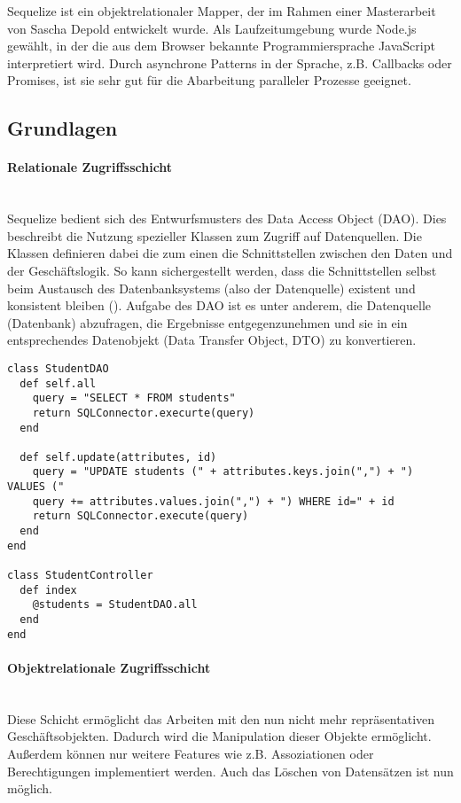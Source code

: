 
Sequelize ist ein objektrelationaler Mapper, der im Rahmen einer Masterarbeit von Sascha Depold entwickelt wurde. Als Laufzeitumgebung wurde Node.js gewählt, in der die aus dem Browser bekannte Programmiersprache JavaScript interpretiert wird. Durch asynchrone Patterns in der Sprache, z.B. Callbacks oder Promises, ist sie sehr gut für die Abarbeitung paralleler Prozesse geeignet.

\subsection{Grundlagen}

\paragraph{Relationale Zugriffsschicht} \hspace{0pt} \\
Sequelize bedient sich des Entwurfsmusters des Data Access Object (DAO). Dies beschreibt die Nutzung spezieller Klassen zum Zugriff auf Datenquellen. Die Klassen definieren dabei die zum einen die Schnittstellen zwischen den Daten und der Geschäftslogik. So kann sichergestellt werden, dass die Schnittstellen selbst beim Austausch des Datenbanksystems (also der Datenquelle) existent und konsistent bleiben (\cite[S. 8]{Depo1}). Aufgabe des DAO ist es unter anderem, die Datenquelle (Datenbank) abzufragen, die Ergebnisse entgegenzunehmen und sie in ein entsprechendes Datenobjekt (Data Transfer Object, DTO) zu konvertieren.

\hspace{1pt}
\begin{lstlisting}[caption=Relationale Zugriffsschicht]
class StudentDAO
  def self.all
    query = "SELECT * FROM students"
    return SQLConnector.execurte(query)
  end
  
  def self.update(attributes, id)
    query = "UPDATE students (" + attributes.keys.join(",") + ") VALUES ("
    query += attributes.values.join(",") + ") WHERE id=" + id
    return SQLConnector.execute(query)
  end
end

class StudentController
  def index
    @students = StudentDAO.all
  end
end
\end{lstlisting}


\paragraph{Objektrelationale Zugriffsschicht} \hspace{0pt} \\
Diese Schicht ermöglicht das Arbeiten mit den nun nicht mehr repräsentativen Geschäftsobjekten. Dadurch wird die Manipulation dieser Objekte ermöglicht. Außerdem können nur weitere Features wie z.B. Assoziationen oder Berechtigungen implementiert werden. Auch das Löschen von Datensätzen ist nun möglich.

